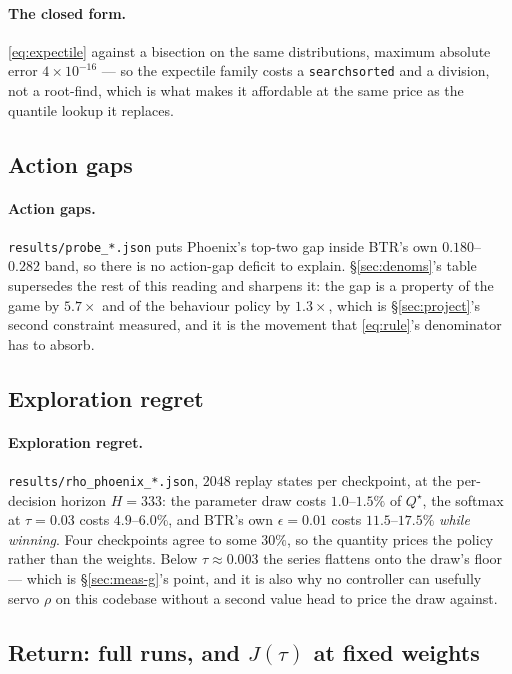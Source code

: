 \documentclass{article}
\begin{document}
\paragraph{The closed form.} \eqref{eq:expectile} against a bisection on the same distributions,
maximum absolute error $4\times10^{-16}$ --- so the expectile family costs a
\texttt{searchsorted} and a division, not a root-find, which is what makes it affordable at the
same price as the quantile lookup it replaces.


\subsection{Action gaps}
\label{sec:meas-gap}

\paragraph{Action gaps.} \texttt{results/probe\_*.json} puts Phoenix's top-two gap inside BTR's
own $0.180$--$0.282$ band, so there is no action-gap deficit to explain. \S\ref{sec:denoms}'s
table supersedes the rest of this reading and sharpens it: the gap is a property of the game by
$5.7\times$ and of the behaviour policy by $1.3\times$, which is \S\ref{sec:project}'s second
constraint measured, and it is the movement that \eqref{eq:rule}'s denominator has to absorb.


\subsection{Exploration regret}
\label{sec:meas-rho}

\paragraph{Exploration regret.} \texttt{results/rho\_phoenix\_*.json}, $2048$ replay states per
checkpoint, at the per-decision horizon $H = 333$: the parameter draw costs $1.0$--$1.5\%$ of
$Q^\star$, the softmax at $\tau = 0.03$ costs $4.9$--$6.0\%$, and BTR's own $\epsilon = 0.01$
costs $11.5$--$17.5\%$ \emph{while winning}. Four checkpoints agree to some $30\%$, so the
quantity prices the policy rather than the weights. Below $\tau \approx 0.003$ the series flattens
onto the draw's floor --- which is \S\ref{sec:meas-g}'s point, and it is also why no controller can
usefully servo $\rho$ on this codebase without a second value head to price the draw against.


\subsection{Return: full runs, and $J(\tau)$ at fixed weights}
\label{sec:meas-return}
\end{document}
